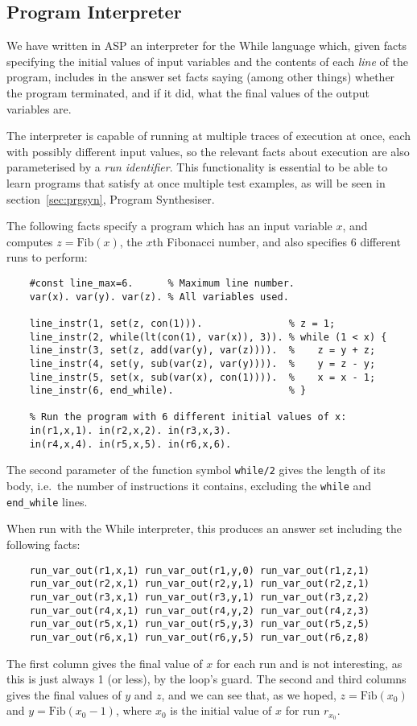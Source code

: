 \documentclass[a4paper,twoside,notitlepage]{article}
\newcommand{\ttt}{\texttt}
\begin{document}
\subsection{Program Interpreter}

We have written in ASP an interpreter for the While language which, given 
facts specifying the initial values of input variables and the contents of 
each \emph{line} of the program, includes in the answer set facts saying 
(among other things) whether the program terminated, and if it did, what the 
final values of the output variables are.

The interpreter is capable of running at multiple traces of execution at once, 
each with possibly different input values, so the relevant facts about 
execution are also parameterised by a \emph{run identifier}. This 
functionality is essential to be able to learn programs that satisfy at once 
multiple test examples, as will be seen in section~\ref{sec:prgsyn}, Program 
Synthesiser.

The following facts specify a program which has an input variable $x$, and 
computes $z = \textrm{Fib}(x)$, the $x$th Fibonacci number, and also specifies 
6 different runs to perform:
\begin{verbatim}
    #const line_max=6.      % Maximum line number.
    var(x). var(y). var(z). % All variables used.
    
    line_instr(1, set(z, con(1))).               % z = 1;
    line_instr(2, while(lt(con(1), var(x)), 3)). % while (1 < x) {
    line_instr(3, set(z, add(var(y), var(z)))).  %    z = y + z;
    line_instr(4, set(y, sub(var(z), var(y)))).  %    y = z - y;
    line_instr(5, set(x, sub(var(x), con(1)))).  %    x = x - 1;
    line_instr(6, end_while).                    % }
    
    % Run the program with 6 different initial values of x:
    in(r1,x,1). in(r2,x,2). in(r3,x,3).
    in(r4,x,4). in(r5,x,5). in(r6,x,6).
\end{verbatim}
The second parameter of the function symbol \texttt{while/2} gives the 
length of its body, i.e.\ the number of instructions it contains, 
excluding the \ttt{while} and \ttt{end\_while} lines.

When run with the While interpreter, this produces an answer set including the 
following facts:
\begin{verbatim}
    run_var_out(r1,x,1) run_var_out(r1,y,0) run_var_out(r1,z,1) 
    run_var_out(r2,x,1) run_var_out(r2,y,1) run_var_out(r2,z,1) 
    run_var_out(r3,x,1) run_var_out(r3,y,1) run_var_out(r3,z,2) 
    run_var_out(r4,x,1) run_var_out(r4,y,2) run_var_out(r4,z,3)
    run_var_out(r5,x,1) run_var_out(r5,y,3) run_var_out(r5,z,5)
    run_var_out(r6,x,1) run_var_out(r6,y,5) run_var_out(r6,z,8) 
\end{verbatim}
The first column gives the final value of $x$ for each run and is not 
interesting, as this is just always 1 (or less), by the loop's guard. The 
second and third columns gives the final values of $y$ and $z$, and we can see 
that, as we hoped, $z=\textrm{Fib}(x_0)$ and $y=\textrm{Fib}(x_0-1)$, where 
$x_0$ is the initial value of $x$ for run $r_{x_0}$.
\end{document}
